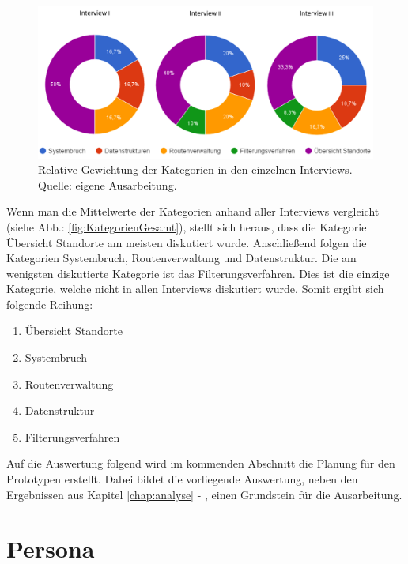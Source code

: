 \documentclass[Bachelorarbeit.tex]{subfiles}
\begin{document}
\begin{figure}[H]
	\centering
	\includegraphics[width=0.9\linewidth]{img/Interviews/VerteilungNachInterview}
	\caption[Relative Gewichtung der Kategorien in den einzelnen Interviews]{Relative Gewichtung der Kategorien in den einzelnen Interviews. Quelle: eigene Ausarbeitung.}
	\label{fig:GewichtungNachInterview}
\end{figure}

Wenn man die Mittelwerte der Kategorien anhand aller Interviews vergleicht (siehe Abb.: \ref{fig:KategorienGesamt}), stellt sich heraus, dass die Kategorie Übersicht Standorte am meisten diskutiert wurde. 
Anschließend folgen die Kategorien Systembruch, Routenverwaltung und Datenstruktur.
Die am wenigsten diskutierte Kategorie ist das Filterungsverfahren. 
Dies ist die einzige Kategorie, welche nicht in allen Interviews diskutiert wurde.
Somit ergibt sich folgende Reihung:

\begin{enumerate}
	\item Übersicht Standorte
	\item Systembruch
	\item Routenverwaltung
	\item Datenstruktur
	\item Filterungsverfahren
\end{enumerate}

Auf die Auswertung folgend wird im kommenden Abschnitt  die Planung für den Prototypen erstellt.
Dabei bildet die vorliegende Auswertung, neben den Ergebnissen aus Kapitel \ref{chap:analyse} - , einen Grundstein für die Ausarbeitung.

\newpage



\section{Persona}
\label{persona}
\end{document}
